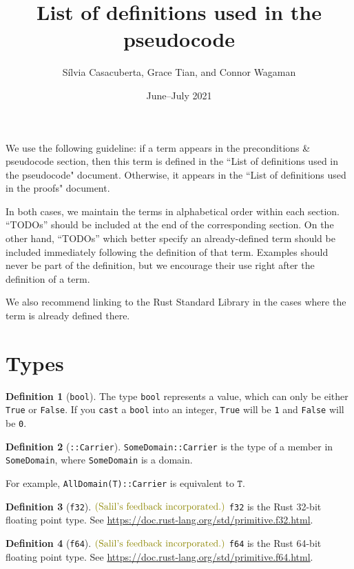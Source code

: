 \documentclass[11pt,a4paper]{article}
\title{List of definitions used in the pseudocode}
\author{S\'ilvia Casacuberta, Grace Tian, and Connor Wagaman}
\date{June--July 2021}
\theoremstyle{definition}
\newtheorem{definition}{Definition}[section]
\newcommand{\sfi}{\text{\textcolor{olive}{(Salil's feedback incorporated.)}}}
\newcommand{\inRust}[2]{See \url{#2}.}
\newcommand{\T}{\texttt{T}}
\begin{document}
\maketitle

We use the following guideline: if a term appears in the preconditions \& pseudocode section, then this term is defined in the ``List of definitions used in the pseudocode" document. Otherwise, it appears in the ``List of definitions used in the proofs" document. 

In both cases, we maintain the terms in alphabetical order within each section. ``TODOs'' should be included at the end of the corresponding section. On the other hand, ``TODOs'' which better specify an already-defined term should be included immediately following the definition of that term. Examples should never be part of the definition, but we encourage their use right after the definition of a term.

We also recommend linking to the Rust Standard Library in the cases where the term is already defined there.

\tableofcontents

\section{Types}

\begin{definition}[\texttt{bool}]
    The type \texttt{bool} represents a value, which can only be either \texttt{True} or \texttt{False}. If you \texttt{cast} a \texttt{bool} into an integer, \texttt{True} will be \texttt{1} and \texttt{False} will be \texttt{0}.
\end{definition}

\begin{definition}[\texttt{::Carrier}]
\texttt{SomeDomain::Carrier} is the type of a member in \texttt{SomeDomain}, where \texttt{SomeDomain} is a domain. 

For example, \texttt{AllDomain(T)::Carrier} is equivalent to $\T$.
\end{definition}

\begin{definition}[\texttt{f32}]$\sfi$
    \texttt{f32} is the Rust 32-bit floating point type. \inRust{f32}{https://doc.rust-lang.org/std/primitive.f32.html}
\end{definition}

\begin{definition}[\texttt{f64}]$\sfi$
    \texttt{f64} is the Rust 64-bit floating point type. \inRust{f64}{https://doc.rust-lang.org/std/primitive.f64.html} 
\end{definition}
\end{document}
